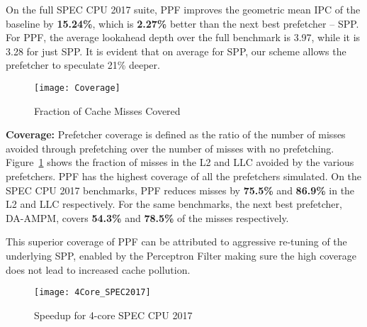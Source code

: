 On the full SPEC CPU 2017 suite, PPF improves the geometric mean IPC
of the baseline by \textbf{15.24\%}, which is \textbf{2.27\%} better
than the next best prefetcher -- SPP. {For PPF, the average 
lookahead depth over the full benchmark is 3.97, while it is 3.28 for just 
SPP. It is evident that on average for SPP, our scheme allows the 
prefetcher to speculate 21\% deeper.}

\begin{figure}[ht]
\texttt{[image: Coverage]}
\caption{Fraction of Cache Misses Covered}
\label{Fig:Coverage}
\end{figure}
%

\noindent \textbf{Coverage:} Prefetcher coverage is defined as the
ratio of the number of misses avoided through prefetching over the
number of misses with no prefetching.  Figure~\ref{Fig:Coverage} shows
the fraction of misses in the L2 and LLC avoided by the various
prefetchers.  PPF has the highest coverage of all the prefetchers
simulated.  On the SPEC CPU 2017 benchmarks, PPF reduces misses by
\textbf{75.5\%} and \textbf{86.9\%} in the L2 and LLC
respectively. For the same benchmarks, the next best prefetcher,
DA-AMPM, covers \textbf{54.3\%} and \textbf{78.5\%} of the misses
respectively.

This superior coverage of PPF can be attributed to aggressive
re-tuning of the underlying SPP, enabled by the Perceptron Filter
making sure the high coverage does not lead to increased cache
pollution.

\begin{figure}[ht]
\texttt{[image: 4Core\_SPEC2017]}
\caption{Speedup for 4-core SPEC CPU 2017}
\label{Fig:4Core_SPEC2017}
\end{figure}

